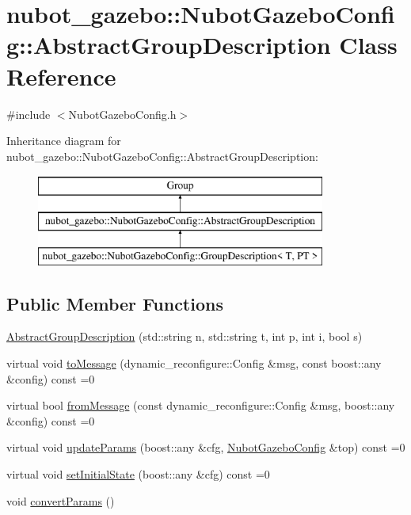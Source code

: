 \hypertarget{classnubot__gazebo_1_1NubotGazeboConfig_1_1AbstractGroupDescription}{\section{nubot\-\_\-gazebo\-:\-:Nubot\-Gazebo\-Config\-:\-:Abstract\-Group\-Description Class Reference}
\label{classnubot__gazebo_1_1NubotGazeboConfig_1_1AbstractGroupDescription}
}


{\ttfamily \#include $<$Nubot\-Gazebo\-Config.\-h$>$}

Inheritance diagram for nubot\-\_\-gazebo\-:\-:Nubot\-Gazebo\-Config\-:\-:Abstract\-Group\-Description\-:\begin{figure}[H]
\begin{center}
\leavevmode
\includegraphics[height=3.000000cm]{classnubot__gazebo_1_1NubotGazeboConfig_1_1AbstractGroupDescription}
\end{center}
\end{figure}
\subsection*{Public Member Functions}
\begin{DoxyCompactItemize}
\item 
\hyperlink{classnubot__gazebo_1_1NubotGazeboConfig_1_1AbstractGroupDescription_a2217ac91bbf64c6ae383ad9d4d218632}{Abstract\-Group\-Description} (std\-::string n, std\-::string t, int p, int i, bool s)
\item 
virtual void \hyperlink{classnubot__gazebo_1_1NubotGazeboConfig_1_1AbstractGroupDescription_a23a1fcb6ff97279fe83c58d67d62c33e}{to\-Message} (dynamic\-\_\-reconfigure\-::\-Config \&msg, const boost\-::any \&config) const =0
\item 
virtual bool \hyperlink{classnubot__gazebo_1_1NubotGazeboConfig_1_1AbstractGroupDescription_a18ae98f3eda54d3982ff1e19dd46f0db}{from\-Message} (const dynamic\-\_\-reconfigure\-::\-Config \&msg, boost\-::any \&config) const =0
\item 
virtual void \hyperlink{classnubot__gazebo_1_1NubotGazeboConfig_1_1AbstractGroupDescription_ae29f54cac4aa3f6509e4363926be3e58}{update\-Params} (boost\-::any \&cfg, \hyperlink{classnubot__gazebo_1_1NubotGazeboConfig}{Nubot\-Gazebo\-Config} \&top) const =0
\item 
virtual void \hyperlink{classnubot__gazebo_1_1NubotGazeboConfig_1_1AbstractGroupDescription_acf1164d41fa1249c22a26c08076d6301}{set\-Initial\-State} (boost\-::any \&cfg) const =0
\item 
void \hyperlink{classnubot__gazebo_1_1NubotGazeboConfig_1_1AbstractGroupDescription_a47c39956c6b342e9b2c323fe28ffc38c}{convert\-Params} ()
\end{DoxyCompactItemize}
